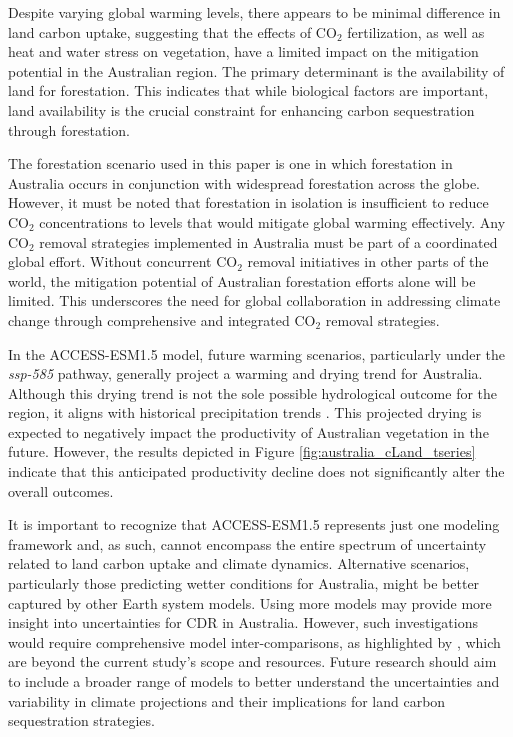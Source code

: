 \documentclass[]{article}
\begin{document}
Despite varying global warming levels, there appears to be minimal difference in land carbon uptake, suggesting that the effects of CO$_2$ fertilization, as well as heat and water stress on vegetation, have a limited impact on the mitigation potential in the Australian region.
The primary determinant is the availability of land for forestation.
This indicates that while biological factors are important, land availability is the crucial constraint for enhancing carbon sequestration through forestation.

The forestation scenario used in this paper is one in which forestation in Australia occurs in conjunction with widespread forestation across the globe.
However, it must be noted that forestation in isolation is insufficient to reduce CO$_2$ concentrations to levels that would mitigate global warming effectively.
Any CO$_2$ removal strategies implemented in Australia must be part of a coordinated global effort.
Without concurrent CO$_2$ removal initiatives in other parts of the world, the mitigation potential of Australian forestation efforts alone will be limited.
This underscores the need for global collaboration in addressing climate change through comprehensive and integrated CO$_2$ removal strategies.

In the ACCESS-ESM1.5 model, future warming scenarios, particularly under the \textit{ssp-585} pathway, generally project a warming and drying trend for Australia.
Although this drying trend is not the sole possible hydrological outcome for the region, it aligns with historical precipitation trends  \parencite{ziehn_australian_2020}.
This projected drying is expected to negatively impact the productivity of Australian vegetation in the future.
However, the results depicted in Figure \ref{fig:australia_cLand_tseries} indicate that this anticipated productivity decline does not significantly alter the overall outcomes.

It is important to recognize that ACCESS-ESM1.5 represents just one modeling framework and, as such, cannot encompass the entire spectrum of uncertainty related to land carbon uptake and climate dynamics.
Alternative scenarios, particularly those predicting wetter conditions for Australia, might be better captured by other Earth system models.
Using more models may provide more insight into uncertainties for CDR in Australia.
However, such investigations would require comprehensive model inter-comparisons, as highlighted by \textcite{loughran_limited_2023}, which are beyond the current study's scope and resources.
Future research should aim to include a broader range of models to better understand the uncertainties and variability in climate projections and their implications for land carbon sequestration strategies.
\end{document}
